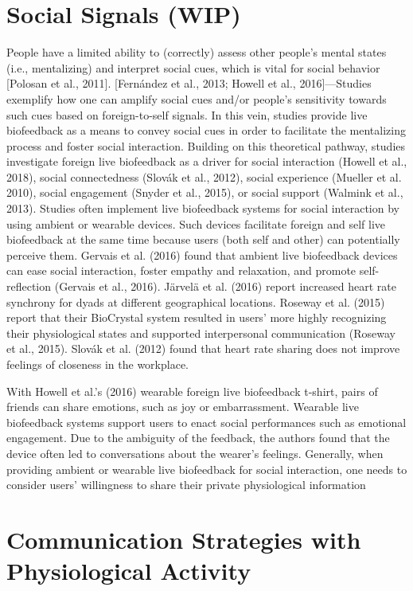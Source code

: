 \section{Social Signals (WIP)}
People have a limited ability to (correctly) assess other people’s mental states (i.e., mentalizing) and interpret social cues, which is vital for social behavior [Polosan et al., 2011]. [Fernández et al., 2013; Howell et al., 2016]—Studies exemplify how one can amplify social cues and/or people’s sensitivity towards such cues based on foreign-to-self signals. In this vein, studies provide live biofeedback as a means to convey social cues in order to facilitate the mentalizing process and foster social interaction. Building on this theoretical pathway, studies investigate foreign live biofeedback as a driver for social interaction (Howell et al., 2018), social connectedness (Slovák et al., 2012), social experience (Mueller et al. 2010), social engagement (Snyder et al., 2015), or social support (Walmink et al., 2013). Studies often implement live biofeedback systems for social interaction by using ambient or wearable devices. Such devices facilitate foreign and self live biofeedback at the same time because users (both self and other) can potentially perceive them. Gervais et al. (2016) found that ambient live biofeedback devices can ease social interaction, foster empathy and relaxation, and promote self-reflection (Gervais et
al., 2016). Järvelä et al. (2016) report increased heart rate synchrony for dyads at different geographical locations. Roseway et al. (2015) report that their BioCrystal system resulted in users’ more highly recognizing their physiological states and supported interpersonal communication (Roseway et al., 2015). Slovák et al. (2012) found that heart rate sharing does not improve feelings of closeness in the workplace.

With Howell et al.’s (2016) wearable foreign live biofeedback t-shirt, pairs of friends can share emotions, such as joy or embarrassment. Wearable live biofeedback systems support users to enact social performances such as emotional engagement. Due to the ambiguity of the feedback, the authors found that the device often led to conversations about the wearer’s feelings. Generally, when providing ambient or wearable live biofeedback for social interaction, one  needs to consider users’ willingness to share their private physiological information 

\section{Communication Strategies with Physiological Activity}
\label{lit_review:biosignals_sharing}


